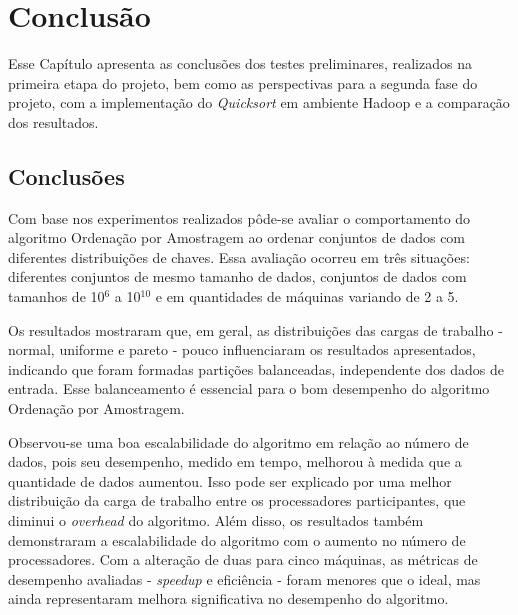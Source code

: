 
\chapter{Conclusão}
\label{cap:conclusao}

Esse Capítulo apresenta as conclusões dos testes preliminares, realizados na primeira etapa do projeto, bem como as perspectivas para a segunda fase do projeto, com a implementação do \textit{Quicksort} em ambiente Hadoop e a comparação dos resultados.

 \section{Conclusões}
 
Com base nos experimentos realizados pôde-se avaliar o comportamento do algoritmo Ordenação por Amostragem ao ordenar conjuntos de dados com 
diferentes distribuições de chaves. Essa avaliação ocorreu em três situações: diferentes conjuntos de mesmo tamanho de dados, conjuntos de dados com tamanhos de 10$^6$ a 10$^{10}$ e em quantidades de máquinas variando de 2 a 5.

Os resultados mostraram que, em geral, as distribuições das cargas de trabalho - normal, uniforme e pareto - pouco influenciaram os resultados apresentados,  indicando que foram formadas partições balanceadas, independente dos dados de entrada. Esse balanceamento é essencial para o bom desempenho do algoritmo Ordenação por Amostragem. 

Observou-se uma boa escalabilidade do algoritmo em relação ao número de dados, pois seu desempenho, medido em tempo, melhorou à medida que a quantidade de dados aumentou. Isso pode ser explicado por uma melhor distribuição da carga de trabalho entre os processadores participantes, que diminui o  \textit{overhead} do algoritmo.
Além disso, os resultados também demonstraram a escalabilidade do algoritmo com o aumento no número de processadores. Com a alteração de duas para cinco máquinas, as métricas de desempenho avaliadas - \textit{speedup} e eficiência - foram menores que o ideal, mas ainda representaram melhora significativa no desempenho do algoritmo. 

